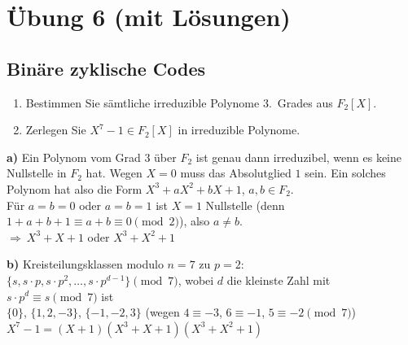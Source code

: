 
\section{Übung 6 (mit Lösungen)}

\subsection{Binäre zyklische Codes}

\begin{aufgabe}[6\_1]
\begin{enumerate}[label=\alph*)]
  \item Bestimmen Sie sämtliche irreduzible Polynome 3.\ Grades aus $F_2[X]$.
  \item Zerlegen Sie $X^7 - 1 \in F_2[X]$ in irreduzible Polynome.
\end{enumerate}
\end{aufgabe}

\begin{loesung}
\textbf{a)} Ein Polynom vom Grad 3 über $F_2$ ist genau dann irreduzibel, wenn es keine Nullstelle in $F_2$ hat.
Wegen $X = 0$ muss das Absolutglied $1$ sein. Ein solches Polynom hat also die Form $X^3 + aX^2 + bX + 1$, $a, b \in F_2$.\\
Für $a = b = 0$ oder $a = b = 1$ ist $X = 1$ Nullstelle (denn $1 + a + b + 1 \equiv a + b \equiv 0 \pmod{2}$), also $a \neq b$.\\
$\Rightarrow\ X^3 + X + 1$ oder $X^3 + X^2 + 1$

\medskip
\textbf{b)} Kreisteilungsklassen modulo $n = 7$ zu $p = 2$: $\{s, s \cdot p, s \cdot p^2, \dots, s \cdot p^{d-1}\} \pmod{7}$, wobei $d$ die kleinste Zahl mit $s \cdot p^d \equiv s \pmod{7}$ ist\\
$\{0\}$, $\{1, 2, -3\}$, $\{-1, -2, 3\}$ \quad (wegen $4 \equiv -3$, $6 \equiv -1$, $5 \equiv -2 \pmod{7}$)\\
$X^7 - 1 = (X + 1)(X^3 + X + 1)(X^3 + X^2 + 1)$
\end{loesung}

